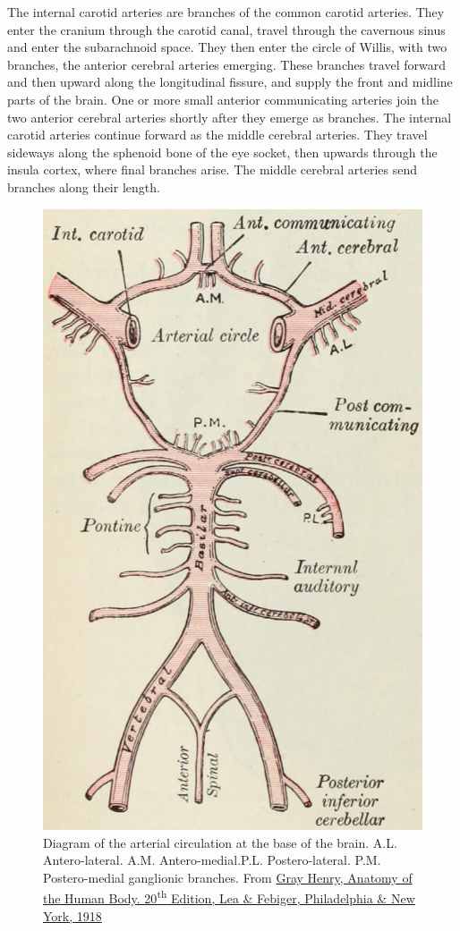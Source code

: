 The internal carotid arteries are branches of the common carotid arteries. They enter the cranium through the carotid canal, travel through the cavernous sinus and enter the subarachnoid space. They then enter the circle of Willis, with two branches, the anterior cerebral arteries emerging. These branches travel forward and then upward along the longitudinal fissure, and supply the front and midline parts of the brain. One or more small anterior communicating arteries join the two anterior cerebral arteries shortly after they emerge as branches. The internal carotid arteries continue forward as the middle cerebral arteries. They travel sideways along the sphenoid bone of the eye socket, then upwards through the insula cortex, where final branches arise. The middle cerebral arteries send branches along their length.



\begin{figure}

{\centering \includegraphics[width=0.7\linewidth]{./figures/cns/GrayAnat1918p574} 

}

\caption{Diagram of the arterial circulation at the base of the brain. A.L. Antero-lateral. A.M. Antero-medial.P.L. Postero-lateral. P.M. Postero-medial ganglionic branches. From \href{https://archive.org/details/anatomyofhumanbo1918gray/page/n6/mode/2up}{Gray Henry, Anatomy of the Human Body. 20\textsuperscript{th} Edition, Lea \& Febiger, Philadelphia \& New York, 1918}}\label{fig:bloodsupplydiagram}
\end{figure}


